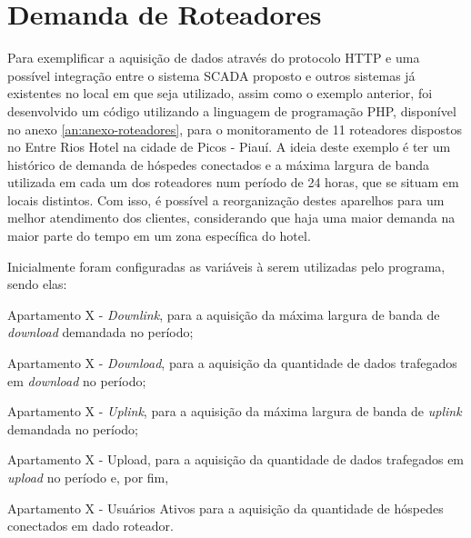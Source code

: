     	\begin{figure}[!h]
    	\end{figure}
    	

\section{Demanda de Roteadores}
\label{sec:demanda-roteadores}
Para exemplificar a aquisição de dados através do protocolo \gls{HTTP} e uma possível integração entre o sistema \gls{SCADA} proposto e outros sistemas já existentes no local em que seja utilizado, assim como o exemplo anterior, foi desenvolvido um código utilizando a linguagem de programação PHP, disponível no anexo \ref{an:anexo-roteadores}, para o monitoramento de 11 roteadores dispostos no Entre Rios Hotel na cidade de Picos - Piauí. A ideia deste exemplo é ter um histórico de demanda de hóspedes conectados e a máxima largura de banda utilizada em cada um dos roteadores num período de 24 horas, que se situam em locais distintos. Com isso, é possível a reorganização destes aparelhos para um melhor atendimento dos clientes, considerando que haja uma maior demanda na maior parte do tempo em um zona específica do hotel.

Inicialmente foram configuradas as variáveis à serem utilizadas pelo programa, sendo elas:

\begin{alineascomponto}
    \item Apartamento X - \textit{Downlink}, para a aquisição da máxima largura de banda de \textit{download} demandada no período;
    \item Apartamento X - \textit{Download}, para a aquisição da quantidade de dados trafegados em \textit{download} no período;
    \item Apartamento X - \textit{Uplink}, para a aquisição da máxima largura de banda de \textit{uplink} demandada no período;
    \item Apartamento X - Upload, para a aquisição da quantidade de dados trafegados em \textit{upload} no período e, por fim,
    \item Apartamento X - Usuários Ativos para a aquisição da quantidade de hóspedes conectados em dado roteador.
\end{alineascomponto}

